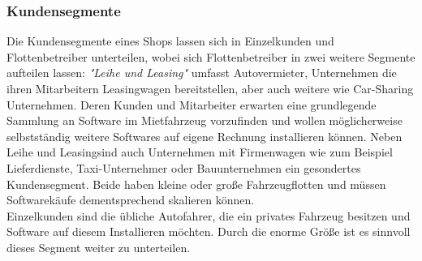 \subsubsection{Kundensegmente}
Die Kundensegmente eines Shops lassen sich in Einzelkunden und Flottenbetreiber unterteilen, wobei sich Flottenbetreiber in zwei weitere Segmente aufteilen lassen: \textit{"Leihe und Leasing"} umfasst Autovermieter, Unternehmen die ihren Mitarbeitern Leasingwagen bereitstellen, aber auch weitere wie Car-Sharing Unternehmen. Deren Kunden und Mitarbeiter erwarten eine grundlegende Sammlung an Software im Mietfahrzeug vorzufinden und wollen möglicherweise selbstständig weitere Softwares auf eigene Rechnung installieren können. Neben \glqq Leihe und Leasing\grqq sind auch Unternehmen mit Firmenwagen wie zum Beispiel Lieferdienste, Taxi-Unternehmer oder Bauunternehmen ein gesondertes Kundensegment. Beide haben kleine oder große Fahrzeugflotten und müssen Softwarekäufe dementsprechend skalieren können. \\
Einzelkunden sind die übliche Autofahrer, die ein privates Fahrzeug besitzen und Software auf diesem Installieren möchten. Durch die enorme Größe ist es sinnvoll dieses Segment weiter zu unterteilen.
%
%	
%		
